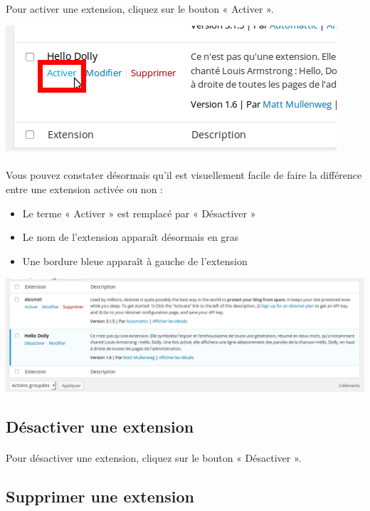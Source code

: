 \documentclass[10pt,a4paper]{article}
\begin{document}
\paragraph{}Pour activer une extension, cliquez sur le bouton « Activer ».
\begin{center}
\includegraphics[scale=0.3]{img/0165.png}
\end{center}
\paragraph{}Vous pouvez constater désormais qu'il est visuellement facile de faire la différence entre une extension activée ou non :
\begin{itemize}
\item Le terme « Activer » est remplacé par « Désactiver »
\item Le nom de l'extension apparaît désormais en gras
\item Une bordure bleue apparaît à gauche de l'extension
\end{itemize}
\begin{center}
\includegraphics[scale=0.3]{img/0166.png}
\end{center}
\subsection{Désactiver une extension}
\paragraph{}Pour désactiver une extension, cliquez sur le bouton « Désactiver ».
\subsection{Supprimer une extension}
\end{document}
